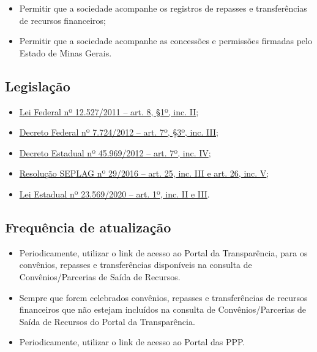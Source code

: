 \documentclass[]{book}
\providecommand{\tightlist}{%
  \setlength{\itemsep}{0pt}\setlength{\parskip}{0pt}}
\begin{document}
\begin{itemize}
\tightlist
\item
  Permitir que a sociedade acompanhe os registros de repasses e transferências de recursos financeiros;
\item
  Permitir que a sociedade acompanhe as concessões e permissões firmadas pelo Estado de Minas Gerais.
\end{itemize}

\hypertarget{legislauxe7uxe3o-7}{%
\subsection{Legislação}\label{legislauxe7uxe3o-7}}

\begin{itemize}
\tightlist
\item
  \href{http://www.planalto.gov.br/ccivil_03/_ato2011-2014/2011/lei/l12527.htm\#art8}{Lei Federal nº 12.527/2011 -- art. 8, §1º, inc. II};
\item
  \href{http://www.planalto.gov.br/ccivil_03/_ato2011-2014/2012/decreto/d7724.htm\#art7}{Decreto Federal nº 7.724/2012 -- art. 7º, §3º, inc. III};
\item
  \href{https://www.almg.gov.br/consulte/legislacao/completa/completa.html?tipo=DEC\&num=45969\&ano=2012}{Decreto Estadual nº 45.969/2012 -- art. 7º, inc. IV};
\item
  \href{http://www.planejamento.mg.gov.br/sites/default/files/documentos/resolucao_sitios_seplag_29_de_05_07_2016_1.pdf}{Resolução SEPLAG nº 29/2016 -- art. 25, inc. III e art. 26, inc. V};
\item
  \href{https://www.almg.gov.br/consulte/legislacao/completa/completa.html?tipo=LEI\&num=23569\&comp=\&ano=2020}{Lei Estadual nº 23.569/2020 -- art. 1º, inc. II e III}.
\end{itemize}

\hypertarget{frequuxeancia-de-atualizauxe7uxe3o-6}{%
\subsection{Frequência de atualização}\label{frequuxeancia-de-atualizauxe7uxe3o-6}}

\begin{itemize}
\tightlist
\item
  Periodicamente, utilizar o link de acesso ao Portal da Transparência, para os convênios, repasses e transferências disponíveis na consulta de Convênios/Parcerias de Saída de Recursos.
\item
  Sempre que forem celebrados convênios, repasses e transferências de recursos financeiros que não estejam incluídos na consulta de Convênios/Parcerias de Saída de Recursos do Portal da Transparência.
\item
  Periodicamente, utilizar o link de acesso ao Portal das PPP.
\end{itemize}
\end{document}

